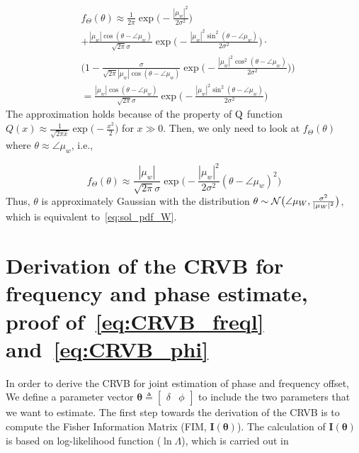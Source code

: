 \begin{appendices}
\begin{equation}
    \label{eq:AL6}
    \begin{aligned} 
    &f_\Theta(\theta) \approx \frac{1}{2\pi}\exp\bigg({-}\frac{|\mu_w|^2}{2\sigma^2}\bigg)\\
    &+\frac{|\mu_w|\cos(\theta{-}\angle\mu_w)}{\sqrt{2\pi}\sigma} 
    \exp\bigg({-}\frac{|\mu_w|^2\sin^2(\theta{-}\angle\mu_w)}{2\sigma^2}\bigg) \cdot \\
    &\bigg(1{-}\frac{\sigma}{\sqrt{2\pi}|\mu_w|\cos(\theta{-}\angle\mu_w)}\exp\bigg({-}\frac{|\mu_w|^2\cos^2(\theta{-}\angle\mu_w)}{2\sigma^2}\bigg)\bigg) \\
    &=\frac{|\mu_w|\cos(\theta{-}\angle\mu_w)}{\sqrt{2\pi}\sigma}\exp\bigg({-}\frac{|\mu_w|^2\sin^2(\theta{-}\angle\mu_w)}{2\sigma^2}\bigg)
    \end{aligned}
\end{equation}
The approximation holds because of the property of $\mathrm{Q}$ function 
$Q(x) \approx\frac{1}{\sqrt{2\pi x}}\exp\big({-}\frac{x^2}{2}\big)$ 
for $x\gg 0$. Then, we only need to look at $f_\Theta(\theta)$ where 
$\theta \approx \angle\mu_w$, i.e.,

\begin{equation}
    \label{eq:AL7}
    f_\Theta(\theta) \approx \frac{|\mu_w|}{\sqrt{2\pi}\sigma}\exp\bigg({-}\frac{|\mu_w|^2}{2\sigma^2}(\theta{-}\angle\mu_w)^2\bigg)
\end{equation}
Thus, $\theta$ is approximately Gaussian with the distribution 
$\theta \sim \mathcal{N} \big(\angle \mu_{W},\frac{\sigma^2}{|\mu_{W}|^2}\big)$, 
which is equivalent to~\eqref{eq:sol_pdf_W}.

\section{Derivation of the CRVB for frequency and phase estimate, 
proof of~\eqref{eq:CRVB_freql} and~\eqref{eq:CRVB_phi}}

\label{BL}

In order to derive the CRVB for joint estimation of phase and frequency 
offset, We define a parameter vector $\bm{\theta}{\triangleq}\begin{bmatrix} \delta&\phi \end{bmatrix}$ 
to include the two parameters that we want to estimate. 
The first step towards the derivation of the CRVB is to compute 
the Fisher Information Matrix (FIM, $\bm{I}(\bm{\theta})$). 
The calculation of $\bm{I}(\bm{\theta})$ is based on log-likelihood 
function ($\ln\Lambda$), which is carried out in \cite[Ch.~4]{VanTrees_vol1}


\end{appendices}
